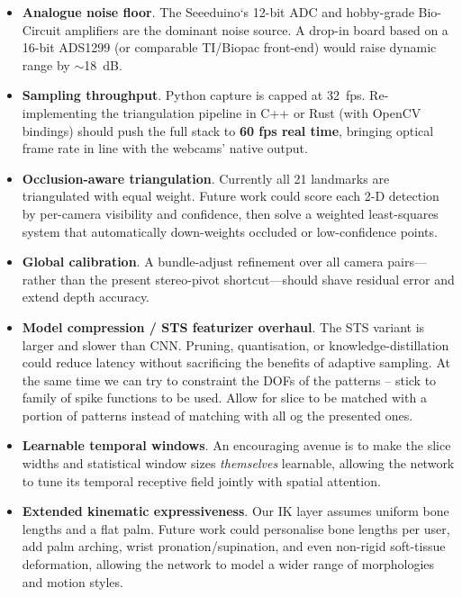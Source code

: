 \begin{itemize}
  \item \textbf{Analogue noise floor}.
        The Seeeduino`s 12-bit ADC and hobby-grade Bio-Circuit amplifiers are
        the dominant noise source. A drop-in board based on a
        16-bit ADS1299 (or comparable TI/Biopac front-end) would raise
        dynamic range by \(\sim\)\SI{18}{dB}.

  \item \textbf{Sampling throughput}.
        Python capture is capped at \SI{32}{fps}. Re-implementing the
        triangulation pipeline in C++ or Rust (with OpenCV bindings) should
        push the full stack to \textbf{60 fps real time}, bringing optical
        frame rate in line with the webcams' native output.

  \item \textbf{Occlusion-aware triangulation}.
        Currently all 21 landmarks are triangulated with equal weight. Future
        work could score each 2-D detection by per-camera visibility and
        confidence, then solve a weighted least-squares system that
        automatically down-weights occluded or low-confidence points.

  \item \textbf{Global calibration}.
        A bundle-adjust refinement over all camera pairs—rather than the
        present stereo-pivot shortcut—should shave residual error and extend
        depth accuracy.

  \item \textbf{Model compression / STS featurizer overhaul}.
        The STS variant is larger and slower than CNN. Pruning, quantisation,
        or knowledge-distillation could reduce latency without sacrificing the
        benefits of adaptive sampling. At the same time we can try to constraint
        the DOFs of the patterns -- stick to family of spike functions to be used.
        Allow for slice to be matched with a portion of patterns instead of
        matching with all og the presented ones.

  \item \textbf{Learnable temporal windows}.
        An encouraging avenue is to make the slice widths and statistical
        window sizes \emph{themselves} learnable, allowing the network to tune
        its temporal receptive field jointly with spatial attention.

  \item \textbf{Extended kinematic expressiveness}.
        Our IK layer assumes uniform bone lengths and a flat palm. Future work
        could personalise bone lengths per user, add palm arching, wrist
        pronation/supination, and even non-rigid soft-tissue deformation,
        allowing the network to model a wider range of morphologies and motion
        styles.

\end{itemize}

